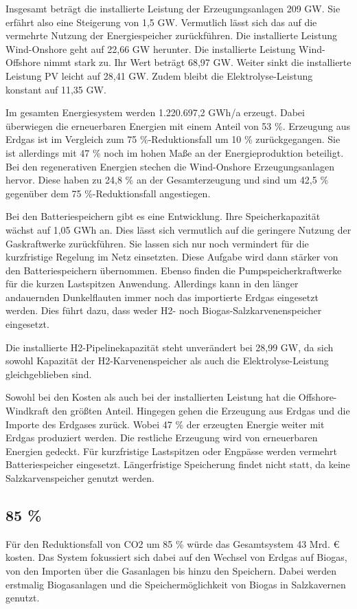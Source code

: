 Insgesamt beträgt die installierte Leistung der Erzeugungsanlagen 209 GW. Sie erfährt also eine Steigerung von 1,5 GW. Vermutlich lässt sich das auf die vermehrte Nutzung der Energiespeicher zurückführen. Die installierte Leistung Wind-Onshore geht auf 22,66 GW herunter. Die installierte Leistung Wind-Offshore nimmt stark zu. Ihr Wert beträgt 68,97 GW.  Weiter sinkt die installierte Leistung PV leicht auf 28,41 GW. Zudem bleibt die Elektrolyse-Leistung konstant auf 11,35 GW. 

Im gesamten Energiesystem werden 1.220.697,2 GWh/a erzeugt. Dabei überwiegen die erneuerbaren Energien mit einem Anteil von 53 \%. Erzeugung aus Erdgas ist im Vergleich zum 75 \%-Reduktionsfall um 10 \% zurückgegangen. Sie ist allerdings mit 47 \% noch im hohen Maße an der Energieproduktion beteiligt. Bei den regenerativen Energien stechen die Wind-Onshore Erzeugungsanlagen hervor. Diese haben zu 24,8 \% an der Gesamterzeugung und sind um 42,5 \% gegenüber dem 75 \%-Reduktionsfall angestiegen. 

Bei den Batteriespeichern gibt es eine Entwicklung. Ihre Speicherkapazität wächst auf 1,05 GWh an. Dies lässt sich vermutlich auf die geringere Nutzung der Gaskraftwerke zurückführen. Sie lassen sich nur noch vermindert für die kurzfristige Regelung im Netz einsetzten. Diese Aufgabe wird dann stärker von den Batteriespeichern übernommen. Ebenso finden die Pumpspeicherkraftwerke für die kurzen Lastspitzen Anwendung. Allerdings kann in den länger andauernden Dunkelflauten immer noch das importierte Erdgas eingesetzt werden. Dies führt dazu, dass weder H2- noch Biogas-Salzkarvenenspeicher eingesetzt. 

Die installierte H2-Pipelinekapazität steht unverändert bei 28,99 GW, da sich sowohl Kapazität der H2-Karvenenspeicher als auch die Elektrolyse-Leistung gleichgeblieben sind.

Sowohl bei den Kosten als auch bei der installierten Leistung hat die Offshore-Windkraft den größten Anteil. Hingegen gehen die Erzeugung aus Erdgas und die Importe des Erdgases zurück. Wobei 47 \% der erzeugten Energie weiter mit Erdgas produziert werden. Die restliche Erzeugung wird von erneuerbaren Energien gedeckt. Für kurzfristige Lastspitzen oder Engpässe werden vermehrt Batteriespeicher eingesetzt. Längerfristige Speicherung findet nicht statt, da keine Salzkarvenspeicher genutzt werden.


\subsection{85 \%}
Für den Reduktionsfall von CO2 um 85 \% würde das Gesamtsystem 43 Mrd. € kosten. Das System fokussiert sich dabei auf den Wechsel von Erdgas auf Biogas, von den Importen über die Gasanlagen bis hinzu den Speichern. Dabei werden erstmalig Biogasanlagen und die Speichermöglichkeit von Biogas in Salzkavernen genutzt.

